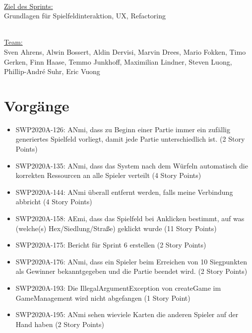 \documentclass[12pt,a4paper, oneside]{article}
\begin{document}
    \noindent
    \\
    \underline{Ziel des Sprints:}
    \\
    Grundlagen für Spielfeldinteraktion, UX, Refactoring


    \noindent
    \\
    \underline {Team:}
    \\
    Sven Ahrens, Alwin Bossert, Aldin Dervisi, Marvin Drees, Mario Fokken,
    Timo Gerken, Finn Haase, Temmo Junkhoff, Maximilian Lindner, Steven Luong, Phillip-André Suhr, Eric Vuong


    \section{Vorgänge}

    \begin{itemize}

        \item SWP2020A-126: ANmi, dass zu Beginn einer Partie immer ein zufällig generiertes Spielfeld vorliegt, damit jede Partie unterschiedlich ist. (2 Story Points)

        \item SWP2020A-135: ANmi, dass das System nach dem Würfeln automatisch die korrekten Ressourcen an alle Spieler verteilt (4 Story Points)

        \item SWP2020A-144: ANmi überall entfernt werden, falls meine Verbindung abbricht (4 Story Points)

        \item SWP2020A-158: AEmi, dass das Spielfeld bei Anklicken bestimmt, auf was (welche(s) Hex/Siedlung/Straße) geklickt wurde (11 Story Points)

        \item SWP2020A-175: Bericht für Sprint 6 erstellen (2 Story Points)

        \item SWP2020A-176: ANmi, dass ein Spieler beim Erreichen von 10 Siegpunkten als Gewinner bekanntgegeben und die Partie beendet wird. (2 Story Points)

        \item SWP2020A-193: Die IllegalArgumentException von createGame im GameManagement wird nicht abgefangen (1 Story Point)

        \item SWP2020A-195: ANmi sehen wieviele Karten die anderen Spieler auf der Hand haben (2 Story Points)


\end{itemize}
\end{document}
